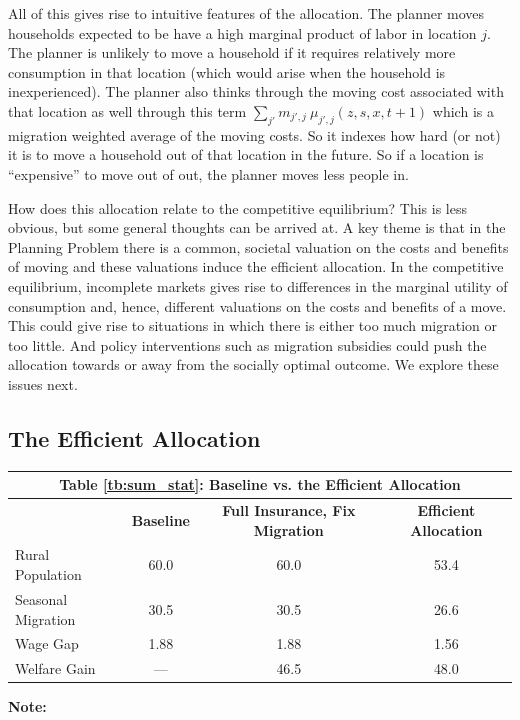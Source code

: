 \documentclass[12pt,pdftex]{article}
\renewcommand{\arraystretch}{1.1}
\begin{document}
\begin{onehalfspacing}
All of this gives rise to intuitive features of the allocation. The planner moves households expected to be have a high marginal product of labor in location $j$. The planner is unlikely to move a household if it requires relatively more consumption in that location (which would arise when the household is inexperienced). The planner also thinks through the moving cost associated with that location as well through this term $\sum_{j'}  m_{j',j} \ \mu_{j',j}(z, s, x, t+1)$ which is a migration weighted average of the moving costs. So it indexes how hard (or not) it is to move a household out of that location in the future. So if a location is ``expensive'' to move out of out, the planner moves less people in. 

How does this allocation relate to the competitive equilibrium? This is less obvious, but some general thoughts can be arrived at. A key theme is that in the Planning Problem there is a common, societal valuation on the costs and benefits of moving and these valuations induce the efficient allocation. In the competitive equilibrium, incomplete markets gives rise to differences in the marginal utility of consumption and, hence, different valuations on the costs and benefits of a move. This could give rise to situations in which there is either too much migration or too little. And policy interventions such as migration subsidies could push the allocation towards or away from the socially optimal outcome. We explore these issues next.


\subsection{The Efficient Allocation}

\begin{table}[t!]
\small
\setlength {\tabcolsep}{1.5mm}
\renewcommand{\arraystretch}{2.30}
\begin{center}\label{tb:effecient}
\begin{tabular}{l c c c }
\multicolumn{4}{c}{\normalsize \textbf{Table \ref{tb:sum_stat}: Baseline vs. the Efficient Allocation}}\\
\hline
\hline
\footnotesize   & \footnotesize  \textbf{Baseline} & \footnotesize   \textbf{Full Insurance, Fix Migration} &  \footnotesize \textbf{Efficient Allocation} \\
\cmidrule(lr){2-2} \cmidrule(lr){3-3} \cmidrule(lr){4-4}
\footnotesize  Rural Population  & 60.0  & 60.0   & 53.4      \\
\footnotesize  Seasonal Migration & 30.5   & 30.5 & 26.6 \\
\footnotesize  Wage Gap  & 1.88  & 1.88  & 1.56     \\
\footnotesize Welfare Gain & --- & 46.5 & 48.0 \\
\hline
\end{tabular}
\parbox[c]{6.75in}{\vspace{.1cm}
{\footnotesize \textbf{Note:} }}
\end{center}
\end{table}


\end{onehalfspacing}
\end{document}
